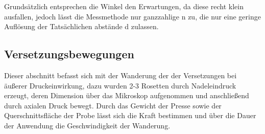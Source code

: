             Grundsätzlich entsprechen die Winkel den Erwartungen, da diese recht klein ausfallen, jedoch lässt die Messmethode nur ganzzahlige n zu, die nur eine
            geringe Auflösung der Tatsächlichen abstände d zulassen.
        \subsection{Versetzungsbewegungen}
            Dieser abschnitt befasst sich mit der Wanderung der der Versetzungen bei äußerer Druckeinwirkung, dazu wurden 2-3 Rosetten durch Nadeleindruck erzeugt,
            deren Dimension über das Mikroskop aufgenommen und anschließend durch axialen Druck bewegt. Durch das Gewicht der Presse sowie der Querschnittsfläche der Probe
            lässt sich die Kraft bestimmen und über die Dauer der Anwendung die Geschwindigkeit der Wanderung.
